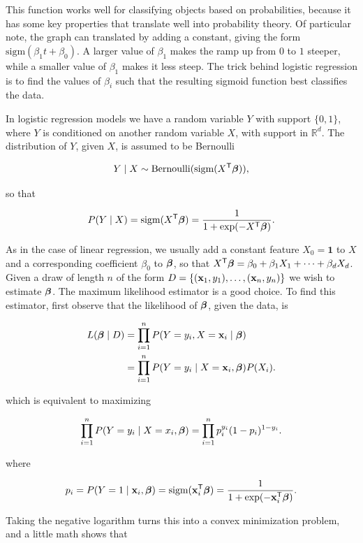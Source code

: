 This function works well for classifying objects based on probabilities, because it has some key properties that translate well into probability theory.
Of particular note, the graph can translated by adding a constant, giving the form $\text{sigm}( \beta_1 t + \beta_0)$.  
A larger value of $\beta_1$ makes the ramp up from $0$ to $1$ steeper, while a smaller value of $\beta_1$ makes it less steep. 
The trick behind logistic regression is to find the values of $\beta_i$ such that the resulting sigmoid function best classifies the data.

In logistic regression models we have a random variable $Y$ with support $\{0,1\}$, where $Y$ is conditioned on another random variable $X$, with support in $\mathbb{R}^d$.
The distribution of $Y$, given $X$, is assumed to be Bernoulli

\[
Y \mid X \sim \text{Bernoulli}(\text{sigm}(X^{\mathsf T}\boldsymbol\beta)),  
\]

so that

\[
    P(Y \mid X) = \text{sigm}(X^{\mathsf T}\boldsymbol\beta) = \frac{1}{1 + \text{exp}(-X^{\mathsf T}\boldsymbol\beta)}.  
\]

As in the case of linear regression, we usually add a constant feature $X_0=\boldsymbol{1}$ to $X$ and a corresponding coefficient $\beta_0$ to $\boldsymbol\beta$, so that $X^{\mathsf T} \boldsymbol\beta = \beta_0 + \beta_1 X_1 + \cdots + \beta_d X_d$.
Given a draw of length $n$ of the form $D = \{(\mathbf{x}_1,y_1),\dots, (\mathbf{x}_n,y_n)\}$ we wish to estimate $\boldsymbol\beta$.  
The maximum likelihood estimator is a good choice.   
To find this estimator, first observe that the likelihood of $\boldsymbol\beta$, given the data, is 

\begin{align*}
    L(\bbeta \mid D) 
    &= \prod_{i=1}^n P(Y=y_i, X = \x_i \mid \bbeta)\\
    &= \prod_{i=1}^n P(Y=y_i \mid X = \x_i,  \bbeta) P( X_i).       %
\end{align*}

which is equivalent to maximizing

\[
    \prod_{i=1}^n P(Y=y_i \mid X=x_i, \boldsymbol\beta) = \prod_{i=1}^n p_i^{y_i}(1-p_i)^{1-y_i}.  
\]

where

\[
p_i = P(Y=1 \mid \mathbf{x}_i, \boldsymbol\beta) = \text{sigm}(\mathbf{x}_i^\mathsf{T} \boldsymbol\beta) =  \frac{1}{1 + \exp(- \mathbf{x}_i^\mathsf{T} \boldsymbol\beta)}.
\]

\noindent Taking the negative logarithm turns this into a convex minimization problem, and a little math shows that

